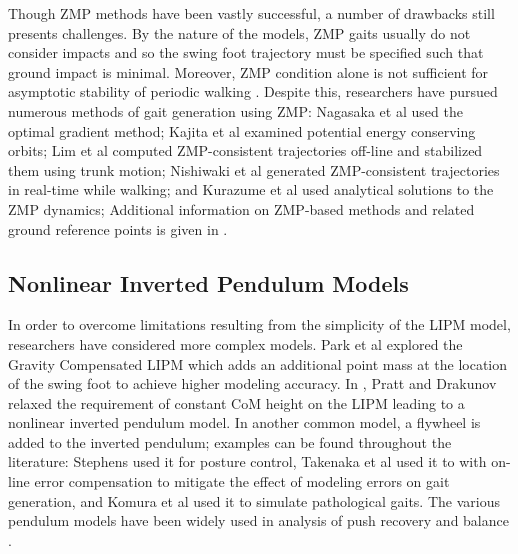 Though ZMP methods have been vastly successful, a number of drawbacks still
presents challenges.
%
By the nature of the models, ZMP gaits usually do not consider impacts and so
the swing foot trajectory must be specified such that ground impact is minimal.
%
Moreover, ZMP condition alone is not sufficient for asymptotic stability of
periodic walking \cite{Choi2005}.
%
Despite this, researchers have pursued numerous methods of gait generation using
ZMP:
%
Nagasaka et al \cite{Nagasaka1999} used the optimal gradient method;
%
Kajita et al \cite{Kajita1992} examined potential energy conserving orbits;
%
Lim et al \cite{Lim2002} computed ZMP-consistent trajectories off-line and
stabilized them using trunk motion;
%
Nishiwaki et al \cite{Nishiwaki2002} generated ZMP-consistent trajectories
in real-time while walking;
%
and Kurazume et al \cite{Kurazume2003} used analytical solutions to the ZMP
dynamics;
%
Additional information on ZMP-based methods and related ground reference points
is given in \cite{Goswami1999, Vukobratovic2004, Vukobratovic2006,
  Popovic2005}.

%

\subsection{Nonlinear Inverted Pendulum Models}

In order to overcome limitations resulting from the simplicity of the LIPM
model, researchers have considered more complex models.
%
Park et al \cite{Park1998} explored the Gravity Compensated LIPM which adds an
additional point mass at the location of the swing foot to achieve higher
modeling accuracy.
%
In \cite{Pratt2007}, Pratt and Drakunov relaxed the requirement of constant CoM
height on the LIPM leading to a nonlinear inverted pendulum model.
%
In another common model, a flywheel is added to the inverted pendulum;
%
examples can be found throughout the literature:
%
Stephens \cite{Stephens2011} used it for posture control,
%
Takenaka et al \cite{Takenaka2009} used it to with on-line error compensation to
mitigate the effect of modeling errors on gait generation,
%
and Komura et al \cite{Komura2005} used it to simulate pathological gaits.
%
The various pendulum models have been widely used in analysis of push recovery
and balance \cite{Takanishi1990, Hof2005, Hyon2007, Stephens2007}.

